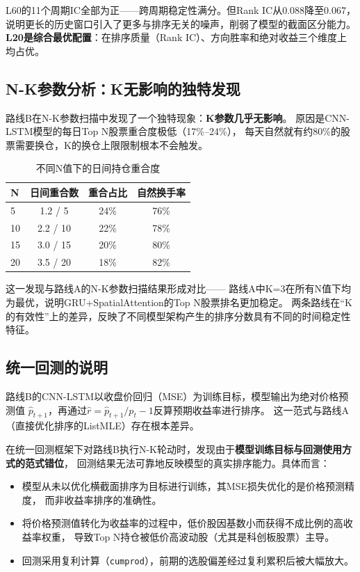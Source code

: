 \documentclass[12pt,a4paper]{ctexart}
\begin{document}
L60的11个周期IC全部为正——跨周期稳定性满分。但Rank IC从0.088降至0.067，
说明更长的历史窗口引入了更多与排序无关的噪声，削弱了模型的截面区分能力。
\textbf{L20是综合最优配置}：在排序质量（Rank IC）、方向胜率和绝对收益三个维度上均占优。

\subsection{N-K参数分析：K无影响的独特发现}

路线B在N-K参数扫描中发现了一个独特现象：\textbf{K参数几乎无影响}。
原因是CNN-LSTM模型的每日Top N股票重合度极低（17\%--24\%），
每天自然就有约80\%的股票需要换仓，K的换仓上限限制根本不会触发。

\begin{table}[htbp]
\centering
\caption{不同N值下的日间持仓重合度}
\label{tab:wu_overlap}
\begin{tabular}{lccc}
\toprule
N & 日间重合数 & 重合占比 & 自然换手率 \\
\midrule
5 & 1.2 / 5 & 24\% & 76\% \\
10 & 2.2 / 10 & 22\% & 78\% \\
15 & 3.0 / 15 & 20\% & 80\% \\
20 & 3.5 / 20 & 18\% & 82\% \\
\bottomrule
\end{tabular}
\end{table}

这一发现与路线A的N-K参数扫描结果形成对比——
路线A中K=3在所有N值下均为最优，说明GRU+SpatialAttention的Top N股票排名更加稳定。
两条路线在“K的有效性”上的差异，反映了不同模型架构产生的排序分数具有不同的时间稳定性特征。

\subsection{统一回测的说明}

路线B的CNN-LSTM以收盘价回归（MSE）为训练目标，模型输出为绝对价格预测值
$\hat{p}_{t+1}$，再通过$\hat{r} = \hat{p}_{t+1} / p_t - 1$反算预期收益率进行排序。
这一范式与路线A（直接优化排序的ListMLE）存在根本差异。

在统一回测框架下对路线B执行N-K轮动时，发现由于\textbf{模型训练目标与回测使用方式的范式错位}，
回测结果无法可靠地反映模型的真实排序能力。具体而言：

\begin{itemize}[leftmargin=*]
    \item 模型从未以优化横截面排序为目标进行训练，其MSE损失优化的是价格预测精度，
          而非收益率排序的准确性。
    \item 将价格预测值转化为收益率的过程中，低价股因基数小而获得不成比例的高收益率权重，
          导致Top N持仓被低价高波动股（尤其是科创板股票）主导。
    \item 回测采用复利计算（\texttt{cumprod}），前期的选股偏差经过复利累积后被大幅放大。
\end{itemize}
\end{document}
